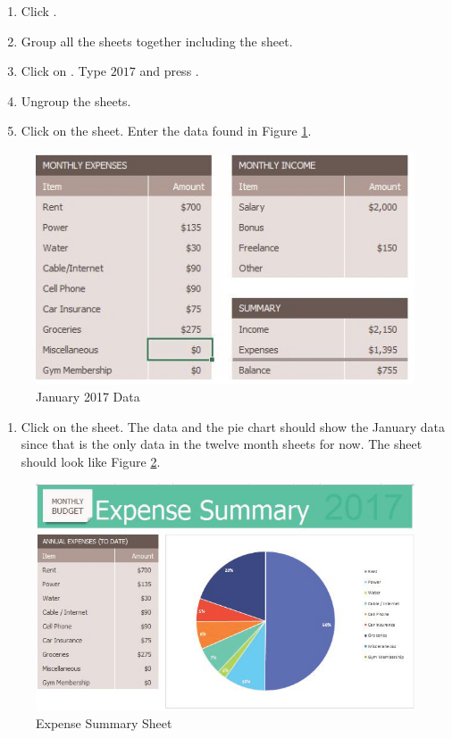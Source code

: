 \begin{enumerate}[resume]
	\item Click .
	\item Group all the sheets together including the  sheet.
	\item Click on . Type $ 2017 $ and press .
	\item Ungroup the sheets.
	\item Click on the  sheet. Enter the data found in Figure \ref{06:fig13}.
\end{enumerate}

\begin{figure}[H]
	\centering
	\includegraphics[width=\maxwidth{.95\linewidth}]{gfx/ch06_fig13}
	\caption{January 2017 Data}
	\label{06:fig13}
\end{figure}

\begin{enumerate}[resume]
	\item Click on the  sheet. The data and the pie chart should show the January data since that is the only data in the twelve month sheets for now. The sheet should look like Figure \ref{06:fig14}.
\end{enumerate}

\begin{figure}[H]
	\centering
	\includegraphics[width=\maxwidth{.95\linewidth}]{gfx/ch06_fig14}
	\caption{Expense Summary Sheet}
	\label{06:fig14}
\end{figure}

